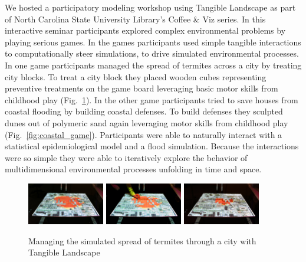 \documentclass[prodmode,acmtochi]{acmsmall} %
\begin{document}
We hosted a participatory modeling workshop using Tangible Landscape 
as part of North Carolina State University Library's Coffee \& Viz series. 
%
In this interactive seminar participants 
explored complex environmental problems 
by playing serious games. 
%
In the games
participants used simple tangible interactions 
to computationally steer simulations, 
to drive simulated environmental processes. 
%
In one game participants managed the spread of termites across a city by treating city blocks. 
To treat a city block they placed wooden cubes representing preventive treatments on the game board 
leveraging basic motor skills from childhood play 
(Fig.~\ref{fig:termite_game}).
%
In the other game participants tried to save houses from coastal flooding by building coastal defenses. 
To build defenses they sculpted dunes out of polymeric sand
again leveraging motor skills from childhood play
(Fig.~\ref{fig:coastal_game}). 
%
Participants were able to naturally 
interact with a statistical epidemiological model 
and a flood simulation. 
Because the interactions were so simple %
they were able to iteratively 
explore the behavior of multidimensional environmental processes
unfolding in time and space. 



\begin{figure}[ht!]
\begin{center}
		\includegraphics[width=0.3\textwidth]{images/termite_game_1.jpg}
		\includegraphics[width=0.3\textwidth]{images/termite_game_2.jpg}
		\includegraphics[width=0.3\textwidth]{images/termite_game_3.jpg}
	\caption{Managing the simulated spread of termites through a city with Tangible Landscape}
	\label{fig:termite_game}
\end{center}
\end{figure}
\end{document}
